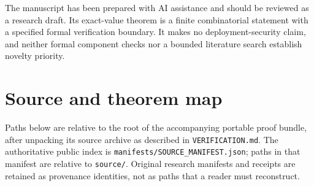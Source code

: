 \documentclass[11pt]{article}
\theoremstyle{definition}\newtheorem{definition}[theorem]{Definition}
\theoremstyle{remark}\newtheorem{remark}[theorem]{Remark}
\newcommand{\src}[1]{{\small\nolinkurl{#1}}}
\begin{document}
The manuscript has been prepared with AI assistance and should be reviewed as a research draft. Its exact-value theorem is a finite combinatorial statement with a specified formal verification boundary. It makes no deployment-security claim, and neither formal component checks nor a bounded literature search establish novelty priority.

\appendix
\section{Source and theorem map}\label{app:map}
Paths below are relative to the root of the accompanying portable proof bundle, after unpacking its source archive as described in \src{VERIFICATION.md}. The authoritative public index is \src{manifests/SOURCE_MANIFEST.json}; paths in that manifest are relative to \src{source/}. Original research manifests and receipts are retained as provenance identities, not as paths that a reader must reconstruct.
\end{document}
